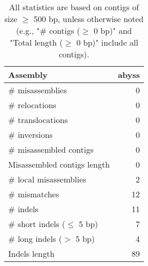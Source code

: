\documentclass[12pt,a4paper]{article}
\begin{document}
\begin{table}[ht]
\begin{center}
\caption{All statistics are based on contigs of size $\geq$ 500 bp, unless otherwise noted (e.g., "\# contigs ($\geq$ 0 bp)" and "Total length ($\geq$ 0 bp)" include all contigs).}
\begin{tabular}{|l*{1}{|r}|}
\hline
Assembly & abyss \\ \hline
\# misassemblies & 0 \\ \hline
\hspace{5mm}\# relocations & 0 \\ \hline
\hspace{5mm}\# translocations & 0 \\ \hline
\hspace{5mm}\# inversions & 0 \\ \hline
\# misassembled contigs & 0 \\ \hline
Misassembled contigs length & 0 \\ \hline
\# local misassemblies & 2 \\ \hline
\# mismatches & 12 \\ \hline
\# indels & 11 \\ \hline
\hspace{5mm}\# short indels ($\leq$ 5 bp) & 7 \\ \hline
\hspace{5mm}\# long indels ($>$ 5 bp) & 4 \\ \hline
Indels length & 89 \\ \hline
\end{tabular}
\end{center}
\end{table}
\end{document}
